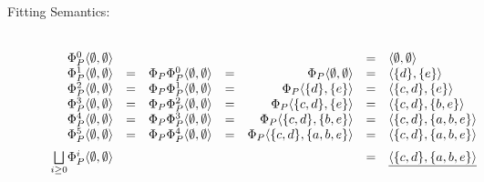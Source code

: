 \begin{Loesung}%
\begin{UList}%
%
\item 
\begin{description}

 \item[Fitting Semantics:] ~\\
   \(
   \begin{array}[t]{rcrcrcl}
     \Phi^0_P\langle \emptyset,\emptyset\rangle & & & & & = &
     \langle\emptyset,\emptyset\rangle \\
     \Phi^1_P\langle \emptyset,\emptyset\rangle & = & 
     \Phi_P\Phi^0_P\langle \emptyset,\emptyset\rangle & = &
     \Phi_P\langle \emptyset,\emptyset\rangle & = & 
     \langle\{d\},\{e\}\rangle \\
     \Phi^2_P\langle \emptyset,\emptyset\rangle & = & 
     \Phi_P\Phi^1_P\langle \emptyset,\emptyset\rangle & = &
     \Phi_P\langle \{d\},\{e\}\rangle & = & 
     \langle\{c,d\},\{e\}\rangle \\
     \Phi^3_P\langle \emptyset,\emptyset\rangle & = & 
     \Phi_P\Phi^2_P\langle \emptyset,\emptyset\rangle & = &
     \Phi_P\langle \{c,d\},\{e\}\rangle & = & 
     \langle\{c,d\},\{b,e\}\rangle \\
     \Phi^4_P\langle \emptyset,\emptyset\rangle & = & 
     \Phi_P\Phi^3_P\langle \emptyset,\emptyset\rangle & = &
     \Phi_P\langle \{c,d\},\{b,e\}\rangle & = & 
     \langle\{c,d\},\{a,b,e\}\rangle \\
     \Phi^5_P\langle \emptyset,\emptyset\rangle & = & 
     \Phi_P\Phi^4_P\langle \emptyset,\emptyset\rangle & = &
     \Phi_P\langle \{c,d\},\{a,b,e\}\rangle & = & 
     \langle\{c,d\},\{a,b,e\}\rangle \\[2mm]
     \underset{i\geq 0}{\bigsqcup}\Phi^i_P\langle \emptyset,\emptyset\rangle 
     & & & & & = & \underline{\langle\{c,d\},\{a,b,e\}\rangle}
   \end{array}
   \)


\end{description}
\end{UList}
\end{Loesung}
